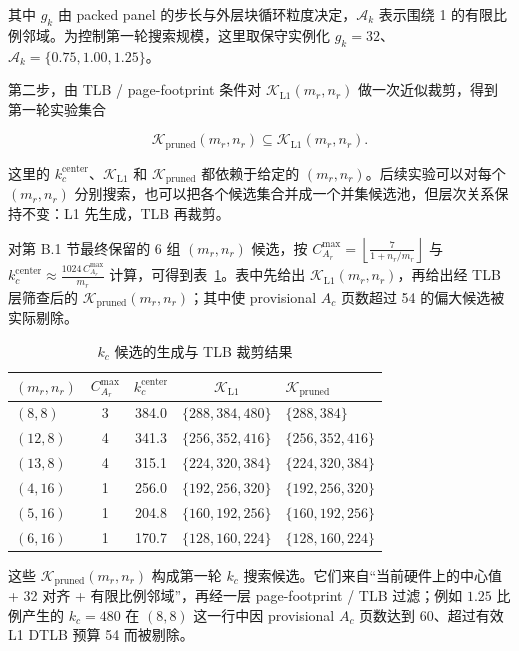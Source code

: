 \documentclass[a4paper,11pt,oneside]{article}
\begin{document}
其中 $g_k$ 由 packed panel 的步长与外层块循环粒度决定，$\mathcal{A}_k$ 表示围绕 1 的有限比例邻域。为控制第一轮搜索规模，这里取保守实例化 $g_k=32$、$\mathcal{A}_k=\{0.75,1.00,1.25\}$。

第二步，由 TLB / page-footprint 条件对 $\mathcal{K}_{\mathrm{L1}}(m_r,n_r)$ 做一次近似裁剪，得到第一轮实验集合

$$
\mathcal{K}_{\mathrm{pruned}}(m_r,n_r) \subseteq \mathcal{K}_{\mathrm{L1}}(m_r,n_r).
$$

这里的 $k_c^{\text{center}}$、$\mathcal{K}_{\mathrm{L1}}$ 和 $\mathcal{K}_{\mathrm{pruned}}$ 都依赖于给定的 $(m_r,n_r)$。后续实验可以对每个 $(m_r,n_r)$ 分别搜索，也可以把各个候选集合并成一个并集候选池，但层次关系保持不变：L1 先生成，TLB 再裁剪。

对第 B.1 节最终保留的 6 组 $(m_r,n_r)$ 候选，按 $C_{A_r}^{\max}=\left\lfloor \frac{7}{1+n_r/m_r} \right\rfloor$ 与 $k_c^{\text{center}} \approx \frac{1024\,C_{A_r}^{\max}}{m_r}$ 计算，可得到表~\ref{tab:appendix_kc_candidates}。表中先给出 $\mathcal{K}_{\mathrm{L1}}(m_r,n_r)$，再给出经 TLB 层筛查后的 $\mathcal{K}_{\mathrm{pruned}}(m_r,n_r)$；其中使 provisional $A_c$ 页数超过 54 的偏大候选被实际剔除。

\begin{table}[H]
\centering
\begin{tabular}{lcccl}
\toprule
\textbf{$(m_r,n_r)$} & $C_{A_r}^{\max}$ & $k_c^{\text{center}}$ & \textbf{$\mathcal{K}_{\mathrm{L1}}$} & \textbf{$\mathcal{K}_{\mathrm{pruned}}$} \\
\midrule
$(8,8)$   & 3 & 384.0 & $\{288,384,480\}$ & $\{288,384\}$ \\
$(12,8)$  & 4 & 341.3 & $\{256,352,416\}$ & $\{256,352,416\}$ \\
$(13,8)$  & 4 & 315.1 & $\{224,320,384\}$ & $\{224,320,384\}$ \\
$(4,16)$  & 1 & 256.0 & $\{192,256,320\}$ & $\{192,256,320\}$ \\
$(5,16)$  & 1 & 204.8 & $\{160,192,256\}$ & $\{160,192,256\}$ \\
$(6,16)$  & 1 & 170.7 & $\{128,160,224\}$ & $\{128,160,224\}$ \\
\bottomrule
\end{tabular}
\caption{$k_c$ 候选的生成与 TLB 裁剪结果}
\label{tab:appendix_kc_candidates}
\end{table}

这些 $\mathcal{K}_{\mathrm{pruned}}(m_r,n_r)$ 构成第一轮 $k_c$ 搜索候选。它们来自“当前硬件上的中心值 + 32 对齐 + 有限比例邻域”，再经一层 page-footprint / TLB 过滤；例如 $1.25$ 比例产生的 $k_c=480$ 在 $(8,8)$ 这一行中因 provisional $A_c$ 页数达到 60、超过有效 L1 DTLB 预算 54 而被剔除。
\end{document}
